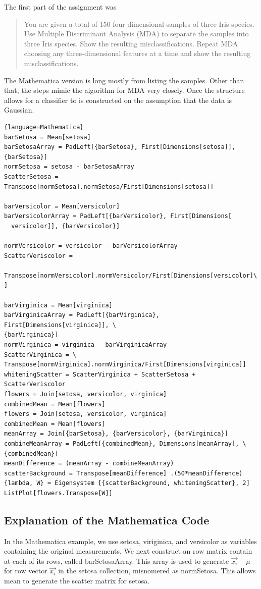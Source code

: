 


The first part of the assignment was 
\begin{quote}
	You are given a total of 150 four dimensional samples of three Iris species.  Use Multiple Discriminant Analysis (MDA) to separate the samples into three Iris species. Show the resulting misclassifications.   Repeat MDA choosing any three-dimensional features at a time and show the resulting misclassifications.
\end{quote}

The Mathematica version is long mostly from listing the samples.  Other than that, the steps mimic the algorithm for MDA very closely.  Once the structure allows for a classifier to is constructed on the assumption that the data is Gaussian.  

\begin{lstlisting}{language=Mathematica}
barSetosa = Mean[setosa]
barSetosaArray = PadLeft[{barSetosa}, First[Dimensions[setosa]], {barSetosa}]
normSetosa = setosa - barSetosaArray
ScatterSetosa = Transpose[normSetosa].normSetosa/First[Dimensions[setosa]]

barVersicolor = Mean[versicolor]
barVersicolorArray = PadLeft[{barVersicolor}, First[Dimensions[
  versicolor]], {barVersicolor}]

normVersicolor = versicolor - barVersicolorArray
ScatterVeriscolor =
         Transpose[normVersicolor].normVersicolor/First[Dimensions[versicolor]\
]

barVirginica = Mean[virginica]
barVirginicaArray = PadLeft[{barVirginica}, First[Dimensions[virginica]], \
{barVirginica}]
normVirginica = virginica - barVirginicaArray
ScatterVirginica = \
Transpose[normVirginica].normVirginica/First[Dimensions[virginica]]
whiteningScatter = ScatterVirginica + ScatterSetosa + ScatterVeriscolor
flowers = Join[setosa, versicolor, virginica]
combinedMean = Mean[flowers]
flowers = Join[setosa, versicolor, virginica]
combinedMean = Mean[flowers]
meanArray = Join[{barSetosa}, {barVersicolor}, {barVirginica}]
combineMeanArray = PadLeft[{combinedMean}, Dimensions[meanArray], \
{combinedMean}]
meanDifference = (meanArray - combineMeanArray)
scatterBackground = Transpose[meanDifference] .(50*meanDifference)
{lambda, W} = Eigensystem [{scatterBackground, whiteningScatter}, 2]
ListPlot[flowers.Transpose[W]]
\end{lstlisting}

\subsection{Explanation of the Mathematica Code}
In the Mathematica example, we use setosa, viriginica, and versicolor as variables containing the original measurements.  We next construct an row matrix contain at each of its rows, called barSetosaArray.  This array is used to generate $\vec{x_i} - \mu$ for row vector $\vec{x_i}$ in the setosa collection, misnomered as normSetosa.  This allows mean to generate the scatter matrix for setosa.  

